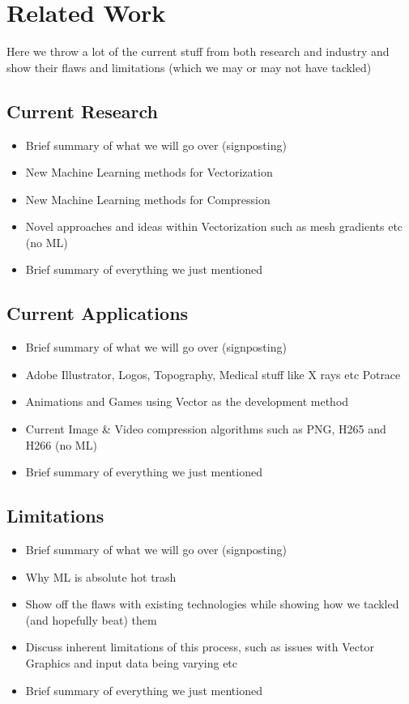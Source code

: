 \documentclass[14pt]{article}
\begin{document}
    \section{Related Work}

    Here we throw a lot of the current stuff from both research and industry and show their flaws and limitations
    (which we may or may not have tackled)

    \subsection{Current Research}

    \begin{itemize}
        \item Brief summary of what we will go over (signposting)
        \item New Machine Learning methods for Vectorization
        \item New Machine Learning methods for Compression
        \item Novel approaches and ideas within Vectorization such as mesh gradients etc (no ML)
        \item Brief summary of everything we just mentioned
    \end{itemize}

    \subsection{Current Applications}

    \begin{itemize}
        \item Brief summary of what we will go over (signposting)
        \item Adobe Illustrator, Logos, Topography, Medical stuff like X rays etc Potrace
        \item Animations and Games using Vector as the development method
        \item Current Image \& Video compression algorithms such as PNG, H265 and H266 (no ML)
        \item Brief summary of everything we just mentioned
    \end{itemize}

    \subsection{Limitations}

    \begin{itemize}
        \item Brief summary of what we will go over (signposting)
        \item Why ML is absolute hot trash
        \item Show off the flaws with existing technologies while showing how we tackled (and hopefully beat) them
        \item Discuss inherent limitations of this process, such as issues with Vector Graphics and input data being varying etc
        \item Brief summary of everything we just mentioned
    \end{itemize}
\end{document}
